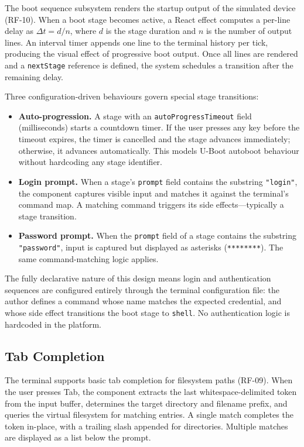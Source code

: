 The boot sequence subsystem renders the startup output of the simulated device (RF-10). When a boot stage becomes active, a React effect computes a per-line delay as $\Delta t = d / n$, where $d$ is the stage duration and $n$ is the number of output lines. An interval timer appends one line to the terminal history per tick, producing the visual effect of progressive boot output. Once all lines are rendered and a \texttt{nextStage} reference is defined, the system schedules a transition after the remaining delay.

Three configuration-driven behaviours govern special stage transitions:
\begin{itemize}
    \item \textbf{Auto-progression.} A stage with an \texttt{autoProgressTimeout} field (milliseconds) starts a countdown timer. If the user presses any key before the timeout expires, the timer is cancelled and the stage advances immediately; otherwise, it advances automatically. This models U-Boot autoboot behaviour without hardcoding any stage identifier.
    \item \textbf{Login prompt.} When a stage's \texttt{prompt} field contains the substring \texttt{"login"}, the component captures visible input and matches it against the terminal's command map. A matching command triggers its side effects---typically a stage transition.
    \item \textbf{Password prompt.} When the \texttt{prompt} field of a stage contains the substring \texttt{"password"}, input is captured but displayed as asterisks (\texttt{********}). The same command-matching logic applies.
\end{itemize}

The fully declarative nature of this design means login and authentication sequences are configured entirely through the terminal configuration file: the author defines a command whose name matches the expected credential, and whose side effect transitions the boot stage to \texttt{shell}. No authentication logic is hardcoded in the platform.

\subsection{Tab Completion}\label{subsec:tab-completion}

The terminal supports basic tab completion for filesystem paths (RF-09). When the user presses Tab, the component extracts the last whitespace-delimited token from the input buffer, determines the target directory and filename prefix, and queries the virtual filesystem for matching entries. A single match completes the token in-place, with a trailing slash appended for directories. Multiple matches are displayed as a list below the prompt.

